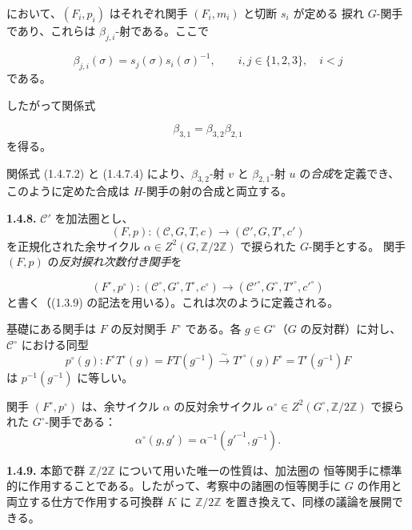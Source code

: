 \clearpage
{}%
において、$(F_i,p_i)$ はそれぞれ関手 $(F_i,m_i)$ と切断 $s_i$ が定める
捩れ $G$-関手であり、これらは $\beta_{j,i}$-射である。ここで

\begin{equation}
  \beta_{j,i}(\sigma)=s_j(\sigma)s_i(\sigma)^{-1},
  \qquad i,j\in\{1,2,3\},\quad i<j
  \tag{1.4.7.3}
\end{equation}
である。

したがって関係式

\begin{equation}
  \beta_{3,1}=\beta_{3,2}\beta_{2,1}
  \tag{1.4.7.4}
\end{equation}
を得る。

関係式 (1.4.7.2) と (1.4.7.4) により、$\beta_{3,2}$-射 $v$ と
$\beta_{2,1}$-射 $u$ の\emph{合成}を定義でき、このように定めた合成は
$H$-関手の射の合成と両立する。

\noindent\textbf{1.4.8.}\quad
$\mathcal C'$ を加法圏とし、
\[
  (F,p)\colon(\mathcal C,G,T,c)\longrightarrow
  (\mathcal C',G,T',c')
\]
を正規化された余サイクル
$\alpha\in Z^2(G,\mathbb Z/2\mathbb Z)$ で捩られた $G$-関手とする。
関手 $(F,p)$ の\emph{反対捩れ次数付き関手}を

\begin{equation}
  (F^{\circ},p^{\circ})\colon
  (\mathcal C^{\circ},G^{\circ},T^{\circ},c^{\circ})
  \longrightarrow
  (\mathcal C'^{\circ},G^{\circ},T'^{\circ},c'^{\circ})
  \tag{1.4.8.1}
\end{equation}
と書く（(1.3.9) の記法を用いる）。これは次のように定義される。

基礎にある関手は $F$ の反対関手 $F^{\circ}$ である。各
$g\in G^{\circ}$（$G$ の反対群）に対し、$\mathcal C^{\circ}$ における同型
\[
  p^{\circ}(g)\colon
  F^{\circ}T^{\circ}(g)=FT(g^{-1})
  \overset{\sim}{\longrightarrow}
  T'^{\circ}(g)F^{\circ}=T'(g^{-1})F
\]
は $p^{-1}(g^{-1})$ に等しい。

関手 $(F^{\circ},p^{\circ})$ は、余サイクル $\alpha$ の反対余サイクル
$\alpha^{\circ}\in Z^2(G^{\circ},\mathbb Z/2\mathbb Z)$ で捩られた
$G^{\circ}$-関手である：
\[
  \alpha^{\circ}(g,g')=\alpha^{-1}(g'^{-1},g^{-1}).
\]

\noindent\textbf{1.4.9.}\quad
本節で群 $\mathbb Z/2\mathbb Z$ について用いた唯一の性質は、加法圏の
恒等関手に標準的に作用することである。したがって、考察中の諸圏の恒等関手に
$G$ の作用と両立する仕方で作用する可換群 $K$ に
$\mathbb Z/2\mathbb Z$ を置き換えて、同様の議論を展開できる。
